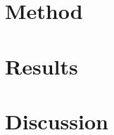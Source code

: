 \documentclass[twoside,letter,10pt]{article}
\begin{document}
\begin{multicols}{2}

\section{Method}
\lipsum[1-5]


\section{Results}
\lipsum[1-5]


\section{Discussion}

\lipsum[1-5]





\end{multicols}
\end{document}
